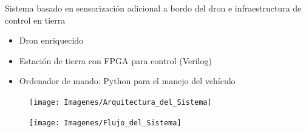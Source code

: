 \documentclass[a4,landscpae]{seminar}
\begin{document}
\begin{hslide}
Sistema basado en sensorizaci\'on adicional a bordo del dron e infraestructura de control en tierra\\

\begin{minipage}{4.9cm}
	\begin{itemize}
		\item Dron enriquecido
	\end{itemize}
	\begin{itemize}
		\item Estaci\'on de tierra con FPGA para control (Verilog)
		\item Ordenador de mando: Python para el manejo del veh\'iculo
	\end{itemize}
\end{minipage} \hfill
\begin{minipage}{8cm}
	\begin{figure}
		\texttt{[image: Imagenes/Arquitectura\_del\_Sistema]}
	\end{figure}
\end{minipage} \hfill
\end{hslide}
\begin{hslide}
\begin{center}
	\begin{figure}[h]
		\texttt{[image: Imagenes/Flujo\_del\_Sistema]}
	\end{figure}
\end{center}
\end{hslide}
\end{document}
